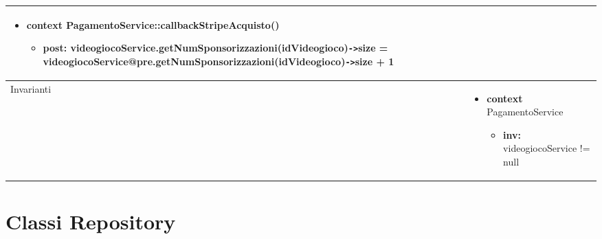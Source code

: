 \begin{tabular}{|| l | p{28em} ||}
\begin{itemize}[leftmargin=*]
		\item \textbf{context} PagamentoService::callbackStripeAcquisto()
		\begin{itemize}
			\item[ ] \textbf{post:} videogiocoService.getNumSponsorizzazioni(idVideogioco)\verb|->|size = videogiocoService@pre.getNumSponsorizzazioni(idVideogioco)\verb|->|size + 1
		\end{itemize}
	\end{itemize}\\
	\hline
	Invarianti & \begin{itemize}
		\item \textbf{context} PagamentoService
		\begin{itemize}
			\item[ ] \textbf{inv:} videogiocoService != null
		\end{itemize}
	\end{itemize}\\
	\hline
\end{tabular}


\newpage
\section{Classi Repository}

